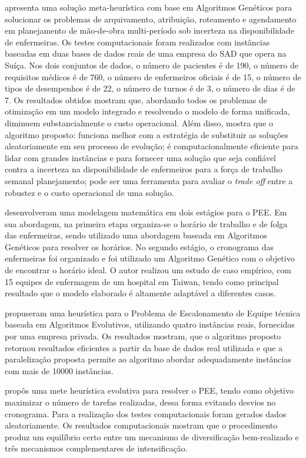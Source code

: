 \cite{nguyen:2016} apresenta uma solução meta-heurística com base em Algoritmos Genéticos para solucionar os problemas de arquivamento, atribuição, roteamento e agendamento em planejamento de mão-de-obra multi-período sob incerteza na disponibilidade de enfermeiras. Os testes computacionais foram realizados com instâncias baseadas em duas bases de dados reais de uma empresa do \ac{SAD} que opera na Suíça. Nos dois conjuntos de dados, o número de pacientes é de 190, o número de requisitos médicos é de 760, o número de enfermeiros oficiais é de 15, o número de tipos de desempenhos é de 22, o número de turnos é de 3, o número de dias é de 7. Os resultados obtidos mostram que, abordando todos os problemas de otimização em um modelo integrado e resolvendo o modelo de forma unificada, diminuem substancialmente o custo operacional. Além disso, mostra que o algoritmo proposto: funciona melhor com a estratégia de substituir as soluções aleatoriamente em seu processo de evolução; é computacionalmente eficiente para lidar com grandes instâncias e para fornecer uma solução que seja confiável contra a incerteza na disponibilidade de enfermeiros para a força de trabalho semanal planejamento; pode ser uma ferramenta para avaliar o \textit{trade off} entre a robustez e o custo operacional de uma solução.

\cite{tsai:2009} desenvolveram uma modelagem matemática em dois estágios para o \ac{PEE}. Em sua abordagem, na primeira etapa organiza-se o horário de trabalho e de folga das enfermeiras,  sendo utilizado uma abordagem baseada em Algoritmos Genéticos para resolver os horários. No segundo estágio, o cronograma das enfermeiras foi organizado e foi utilizado um  Algoritmo Genético com o objetivo de encontrar o horário ideal. O autor realizou um estudo de caso empírico, com 15 equipes de enfermagem de um hospital em Taiwan, tendo como principal resultado que o modelo elaborado é altamente adaptável a diferentes casos.

 \cite{luna:2013} propuseram uma heurística para o Problema de Escalonamento de Equipe técnica baseada em Algoritmos Evolutivos, utilizando quatro instâncias reais, fornecidas por uma empresa privada. Os resultados mostram,  que o algoritmo proposto retornou resultados eficientes a partir da base de dados real utilizada e  que a paralelização proposta permite ao algoritmo abordar adequadamente instâncias com mais de 10000 instâncias. 
 
\cite{maenhout:2011} propôs uma mete heurística evolutiva para resolver o \ac{PEE}, tendo como objetivo maximizar o número de tarefas realizadas, dessa forma evitando desvios no cronograma. Para a realização dos testes computacionais foram gerados dados aleatoriamente. Os resultados computacionais mostram que o procedimento produz um equilíbrio certo entre um mecanismo de diversificação bem-realizado e três mecanismos complementares de intensificação. 


